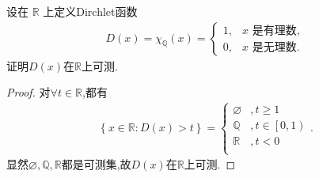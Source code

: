 \documentclass[../../main.tex]{subfiles}%
\begin{document}
\begin{example}
设在 \(\mathbb{R}\) 上定义Dirchlet函数
\begin{align*}
D(x)=\chi_{\mathbb{Q}}(x)=\begin{cases}
1, & x\text{ 是有理数},\\
0, & x\text{ 是无理数}.
\end{cases}
\end{align*}
证明$D(x)$在$\mathbb{R}$上可测.
\end{example}
\begin{proof}

对$\forall t\in \mathbb{R}$,都有
\begin{align*}
\left\{ x\in \mathbb{R} :D\left( x \right) >t \right\} =\begin{cases}
\varnothing &,t\geqslant 1\\
\mathbb{Q} &,t\in \left[ 0,1 \right)\\
\mathbb{R} &,t<0\\
\end{cases}.
\end{align*}
显然$\varnothing,\mathbb{Q},\mathbb{R}$都是可测集,故$D\left( x \right)$在$\mathbb{R}$上可测.

\end{proof}
\end{document}
